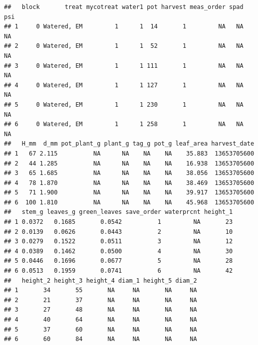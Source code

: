 \documentclass[krantz2,ChapterTOCs]{krantz}\usepackage{knitr}
\begin{document}
\begin{knitrout}\footnotesize
{}\color{fgcolor}\begin{kframe}
\begin{alltt}
 \hlkwb{<-} \hlstd{(} \hlstd{=} \hlstd{,}  \hlstd{=} \hlstd{)}
\end{alltt}


{\ttfamily\noindent\itshape\color{messagecolor}{\#\# re-encoding from UTF-8}}\begin{alltt}
\end{alltt}
\begin{verbatim}
##   block       treat mycotreat water1 pot harvest meas_order spad psi
## 1     0 Watered, EM         1      1  14       1         NA   NA  NA
## 2     0 Watered, EM         1      1  52       1         NA   NA  NA
## 3     0 Watered, EM         1      1 111       1         NA   NA  NA
## 4     0 Watered, EM         1      1 127       1         NA   NA  NA
## 5     0 Watered, EM         1      1 230       1         NA   NA  NA
## 6     0 Watered, EM         1      1 258       1         NA   NA  NA
##   H_mm  d_mm pot_plant_g plant_g tag_g pot_g leaf_area harvest_date
## 1   67 2.115          NA      NA    NA    NA    35.883  13653705600
## 2   44 1.285          NA      NA    NA    NA    16.938  13653705600
## 3   65 1.685          NA      NA    NA    NA    38.056  13653705600
## 4   78 1.870          NA      NA    NA    NA    38.469  13653705600
## 5   71 1.900          NA      NA    NA    NA    39.917  13653705600
## 6  100 1.810          NA      NA    NA    NA    45.968  13653705600
##   stem_g leaves_g green_leaves save_order waterprcnt height_1
## 1 0.0372   0.1685       0.0542          1         NA       23
## 2 0.0139   0.0626       0.0443          2         NA       10
## 3 0.0279   0.1522       0.0511          3         NA       12
## 4 0.0389   0.1462       0.0500          4         NA       30
## 5 0.0446   0.1696       0.0677          5         NA       28
## 6 0.0513   0.1959       0.0741          6         NA       42
##   height_2 height_3 height_4 diam_1 height_5 diam_2
## 1       34       55       NA     NA       NA     NA
## 2       21       37       NA     NA       NA     NA
## 3       27       48       NA     NA       NA     NA
## 4       40       64       NA     NA       NA     NA
## 5       37       60       NA     NA       NA     NA
## 6       60       84       NA     NA       NA     NA
\end{verbatim}
\end{kframe}
\end{knitrout}
\end{document}
